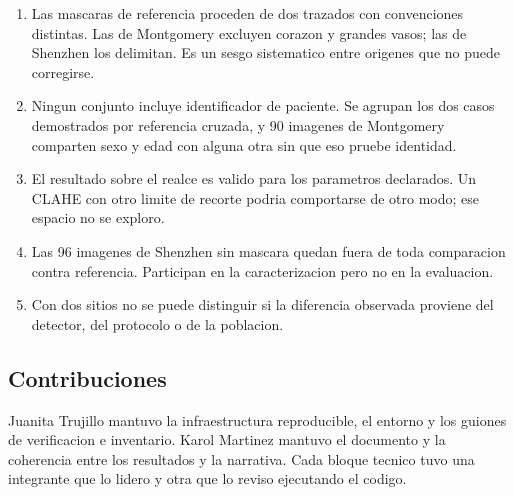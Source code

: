 \documentclass[11pt,a4paper]{article}
\begin{document}
\begin{enumerate}
    \item Las mascaras de referencia proceden de dos trazados con convenciones
    distintas. Las de Montgomery excluyen corazon y grandes vasos; las de
    Shenzhen los delimitan. Es un sesgo sistematico entre origenes que no
    puede corregirse.
    \item Ningun conjunto incluye identificador de paciente. Se agrupan los
    dos casos demostrados por referencia cruzada, y 90 imagenes de Montgomery
    comparten sexo y edad con alguna otra sin que eso pruebe identidad.
    \item El resultado sobre el realce es valido para los parametros
    declarados. Un CLAHE con otro limite de recorte podria comportarse de otro
    modo; ese espacio no se exploro.
    \item Las 96 imagenes de Shenzhen sin mascara quedan fuera de toda
    comparacion contra referencia. Participan en la caracterizacion pero no en
    la evaluacion.
    \item Con dos sitios no se puede distinguir si la diferencia observada
    proviene del detector, del protocolo o de la poblacion.
\end{enumerate}

\subsection{Contribuciones}

Juanita Trujillo mantuvo la infraestructura reproducible, el entorno y los
guiones de verificacion e inventario. Karol Martinez mantuvo el documento y la
coherencia entre los resultados y la narrativa. Cada bloque tecnico tuvo una
integrante que lo lidero y otra que lo reviso ejecutando el codigo.

\nocite{*}


\end{document}
